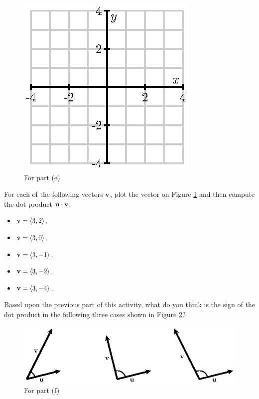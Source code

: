 \begin{pa}
    \begin{figure}[ht]
      \begin{center}
        \includegraphics{figures/fig_9_3_preview_1.eps}
        \caption{For part (e)}
        \label{F:9.3.preview.2}
      \end{center}
    \end{figure}

    For each of the following vectors $\mathbf{v}$, plot the vector on Figure
    \ref{F:9.3.preview.2} and then compute the dot product
    $\mathbf{u}\cdot\mathbf{v}$. 

    \begin{itemize}
      \item $\mathbf{v}=\langle 3, 2 \rangle$.
      \item $\mathbf{v}=\langle 3, 0 \rangle$.
      \item $\mathbf{v}=\langle 3,-1 \rangle$.
      \item $\mathbf{v}=\langle 3,-2 \rangle$.
      \item $\mathbf{v}=\langle 3,-4 \rangle$.
      \end{itemize}

    \item Based upon the previous part of this activity, what do you
      think is the sign of the dot product in the following three
      cases shown in Figure \ref{F:9.3.preview.3}?

    \begin{figure}[ht]
      \begin{center}
        \includegraphics{figures/fig_9_3_preview_2.eps}
        \caption{For part (f)}
        \label{F:9.3.preview.3}
      \end{center}
    \end{figure}

      


    \ea

\end{pa} 

